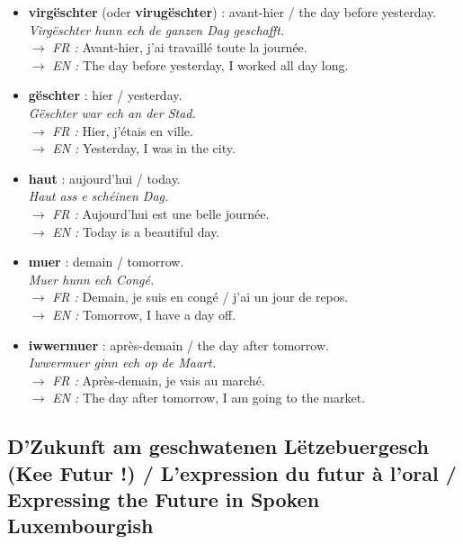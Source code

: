 \begin{itemize}
    \item \textbf{virgëschter} (oder \textbf{virugëschter}) : avant-hier / the day before yesterday. \\
    \textit{Virgëschter hunn ech de ganzen Dag geschafft.} \\
    $\rightarrow$ \textit{FR :} Avant-hier, j'ai travaillé toute la journée. \\
    $\rightarrow$ \textit{EN :} The day before yesterday, I worked all day long.

    \item \textbf{gëschter} : hier / yesterday. \\
    \textit{Gëschter war ech an der Stad.} \\
    $\rightarrow$ \textit{FR :} Hier, j'étais en ville. \\
    $\rightarrow$ \textit{EN :} Yesterday, I was in the city.

    \item \textbf{haut} : aujourd'hui / today. \\
    \textit{Haut ass e schéinen Dag.} \\
    $\rightarrow$ \textit{FR :} Aujourd'hui est une belle journée. \\
    $\rightarrow$ \textit{EN :} Today is a beautiful day.

    \item \textbf{muer} : demain / tomorrow. \\
    \textit{Muer hunn ech Congé.} \\
    $\rightarrow$ \textit{FR :} Demain, je suis en congé / j'ai un jour de repos. \\
    $\rightarrow$ \textit{EN :} Tomorrow, I have a day off.

    \item \textbf{iwwermuer} : après-demain / the day after tomorrow. \\
    \textit{Iwwermuer ginn ech op de Maart.} \\
    $\rightarrow$ \textit{FR :} Après-demain, je vais au marché. \\
    $\rightarrow$ \textit{EN :} The day after tomorrow, I am going to the market.
\end{itemize}

\subsection{D'Zukunft am geschwatenen Lëtzebuergesch (Kee Futur !) / L'expression du futur à l'oral / Expressing the Future in Spoken Luxembourgish}


